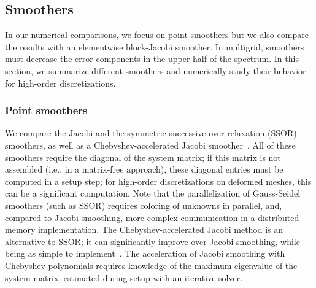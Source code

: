 \documentclass[times]{nlaauth}
\begin{document}




\subsection{Smoothers}\label{subsec:smoothers}
In our numerical comparisons, we focus on point smoothers but we also compare
the results with an elementwise block-Jacobi smoother. In multigrid,
smoothers must decrease the error components in the
upper half of the spectrum.  In this section, we summarize different
smoothers and numerically study their behavior for high-order
discretizations.

\subsubsection{Point smoothers}
We compare the Jacobi and the symmetric successive over
relaxation (SSOR) smoothers, as well as a Chebyshev-accelerated Jacobi
smoother~\cite{Brandt77}. All of these smoothers require the diagonal of the
system matrix; if this matrix is not  assembled (i.e., in a matrix-free approach),
these diagonal entries must be computed in a setup step; for high-order discretizations on deformed meshes, this can be a significant computation.  Note that the
parallelization of Gauss-Seidel smoothers (such as SSOR) requires coloring of
unknowns in parallel, and, compared to Jacobi smoothing, more
complex communication in a distributed memory implementation. The
Chebyshev-accelerated Jacobi method is an alternative to SSOR; it
can significantly improve over Jacobi smoothing, while being as simple to
implement~\cite{AdamsBrezinaHuEtAl03}. The acceleration of Jacobi smoothing
with Chebyshev polynomials requires knowledge of the maximum eigenvalue of
the system matrix, estimated during setup with an iterative solver.
\end{document}
